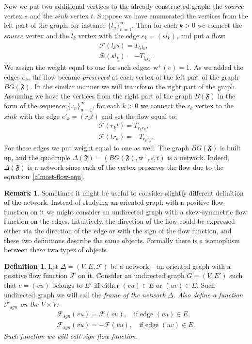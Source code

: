 \documentclass[12pt]{article}
\theoremstyle{definition}
\newtheorem{remark}{Remark}
\newtheorem{definition}{Definition}
\newcommand{\seq}[1]{\{{#1}_n\}_{n=1}^\infty}
\newcommand{\fsys}{\mathfrak{F}}
\newcommand{\wtpos}{\mathrm{w}^+}
\newcommand{\flow}{\mathcal{F}}
\newcommand{\flowsgn}{\mathcal{F}_{sgn}}
\newcommand{\source}{\mathit{source}}
\newcommand{\sink}{\mathit{sink}}
\newcommand{\net}{\Delta}
\numberwithin{remark}{section}
\numberwithin{theorem}{section}
\numberwithin{prop}{section}
\numberwithin{equation}{section}
\numberwithin{lemma}{section}
\numberwithin{prop_under_lemma}{lemma}
\begin{document}
    Now we put two additional vertices to the already constructed graph:
    the $\source$ vertex $s$ and the $\sink$ vertex $t$.
    Suppose we have enumerated the vertices from the left part of the graph, for instance $\seq{l}$.
    Then for each $k > 0$ we connect the $\source$ vertex and the $l_k$ vertex with
    the edge $e_k = (s l_k)$, and put a flow:
    \begin{align*}
      \flow(l_k s) = T_{l_k l_k},\\
      \flow(s l_k) = -T_{l_k l_k}.
    \end{align*}
    We assign the weight equal to one for such edges: $\wtpos(e) = 1$.
    As we added the edges ${e_k}$, the flow became \emph{preserved} at each vertex of the left part of the graph $BG(\fsys)$.
    In the similar manner we will transform the right part of the graph.
    Assuming we have the vertices from the right part of the graph $B(\fsys)$ in the form of the sequence $\seq{r}$,
    for each $k > 0$ we connect the $r_k$ vertex to the $\sink$ with the edge $e'_k=(r_k t)$
    and set the flow equal to:
    \begin{align*}
      \flow(r_k t) = T_{r_k r_k},\\
      \flow(t r_k) = -T_{r_k r_k}.
    \end{align*}
    For these edges we put weight equal to one as well.
    The graph $BG(\fsys)$ is built up, and the quadruple $\net(\fsys) = (BG(\fsys), \wtpos, s, t)$ is a network.
    Indeed, $\net(\fsys)$ is a network since each of the vertex preserves
    the flow due to the equation~\eqref{almost-flow-eqn}.
    \begin{remark}
      Sometimes it might be useful to consider slightly different definition of the network.
      Instead of studying an oriented graph with a positive flow function on it we might consider
      an undirected graph with a skew-symmetric flow function on the edges.
      Intuitively, the direction of the flow could be expressed either via the direction of the edge
      or with the sign of the flow function, and these two definitions describe the same objects.
      Formally there is a isomophism between these two types of objects.
    \end{remark}
    \begin{definition}
      Let $\net=(V,E,\flow)$ be a network -- an oriented graph with a positive flow function $\flow$ on it.
      Consider an undirected graph $G=(V,E')$ such that $e=(vu)$ belongs to $E'$ iff
      either $(vu) \in E$ or $(uv) \in E$.
      Such undirected graph we will call the \it{frame} of the network $\net$.
      Also define a function $\flowsgn$ on the $V \times V$:
      \begin{align*}
        \flowsgn(vu) = \flow(vu), \quad \text{if edge } (vu) \in E,\\
        \flowsgn(vu) = -\flow(vu), \quad \text{if edge } (uv) \in E.
      \end{align*}
      Such function we will call \it{sign-flow} function.
    \end{definition}
\end{document}
